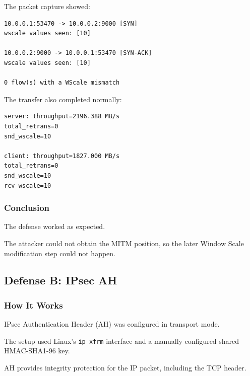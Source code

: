 \documentclass[11pt]{article}
\begin{document}
The packet capture showed:

\begin{lstlisting}
10.0.0.1:53470 -> 10.0.0.2:9000 [SYN]
wscale values seen: [10]

10.0.0.2:9000 -> 10.0.0.1:53470 [SYN-ACK]
wscale values seen: [10]

0 flow(s) with a WScale mismatch
\end{lstlisting}

The transfer also completed normally:

\begin{lstlisting}
server: throughput=2196.388 MB/s
total_retrans=0
snd_wscale=10

client: throughput=1827.000 MB/s
total_retrans=0
snd_wscale=10
rcv_wscale=10
\end{lstlisting}

\subsubsection*{Conclusion}

The defense worked as expected.

The attacker could not obtain the MITM position, so the later
Window Scale modification step could not happen.

\subsection{Defense B: IPsec AH}

\subsubsection*{How It Works}

IPsec Authentication Header (AH) was configured in transport mode.

The setup used Linux's \texttt{ip xfrm} interface and a manually
configured shared HMAC-SHA1-96 key.

AH provides integrity protection for the IP packet, including the
TCP header.
\end{document}
